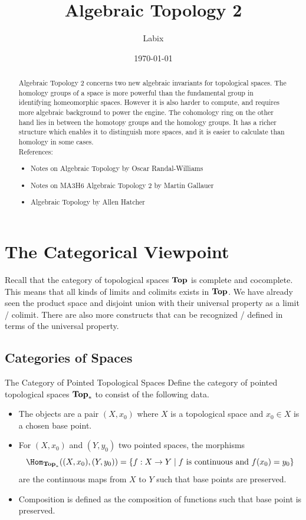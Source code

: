 \documentclass[a4paper]{article}
\title{Algebraic Topology 2}
\author{Labix}
\date{\today}
\begin{document}
\maketitle
\begin{abstract}
Algebraic Topology 2 concerns two new algebraic invariants for topological spaces. The homology groups of a space is more powerful than the fundamental group in identifying homeomorphic spaces. However it is also harder to compute, and requires more algebraic background to power the engine. The cohomology ring on the other hand lies in between the homotopy groups and the homology groups. It has a richer structure which enables it to distinguish more spaces, and it is easier to calculate than homology in some cases. \\

References: 
\begin{itemize}
\item Notes on Algebraic Topology by Oscar Randal-Williams
\item Notes on MA3H6 Algebraic Topology 2 by Martin Gallauer
\item Algebraic Topology by Allen Hatcher
\end{itemize}
\end{abstract}
\pagebreak
\tableofcontents

\pagebreak
\section{The Categorical Viewpoint}
Recall that the category of topological spaces $\bold{Top}$ is complete and cocomplete. This means that all kinds of limits and colimits exists in $\bold{Top}$. We have already seen the product space and disjoint union with their universal property as a limit / colimit. There are also more constructs that can be recognized / defined in terms of the universal property. 

\subsection{Categories of Spaces}
\begin{defn}{The Category of Pointed Topological Spaces}{} Define the category of pointed topological spaces $\bold{Top}_\ast$ to consist of the following data. 
\begin{itemize}
\item The objects are a pair $(X,x_0)$ where $X$ is a topological space and $x_0\in X$ is a chosen base point. 
\item For $(X,x_0)$ and $(Y,y_0)$ two pointed spaces, the morphisms $$\Hom_{\bold{Top}_\ast}((X,x_0),(Y,y_0))=\{f:X\to Y\;|\;f\text{ is continuous and }f(x_0)=y_0\}$$ are the continuous maps from $X$ to $Y$ such that base points are preserved. 
\item Composition is defined as the composition of functions such that base point is preserved. 
\end{itemize}
\end{defn}
\end{document}
